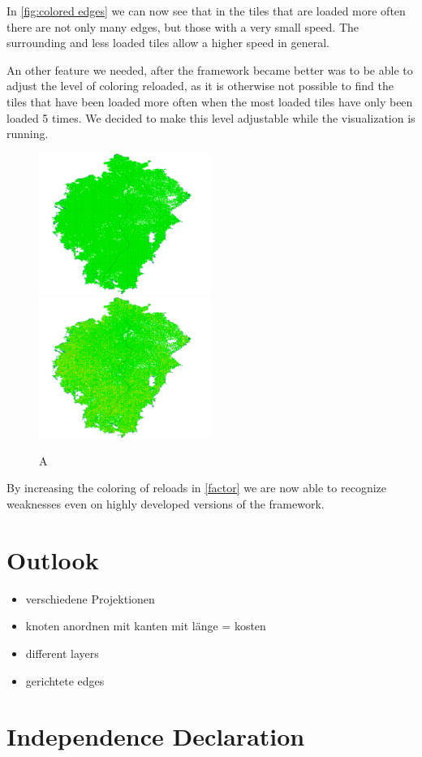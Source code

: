 \documentclass
[
    paper = a4,
    pagesize,
    12 pt,
    oneside,                       %
    open = right,
    DIV = calc,
    BCOR = 0 mm,                   %
    bibtotoc
]
{scrbook}
\begin{document}
In \cref{fig:colored edges} we can now see that in the tiles that are loaded more often there are not only many edges, but those with a very small speed.
The surrounding and less loaded tiles allow a higher speed in general.

An other feature we needed, after the framework became better was to be able to adjust the level of coloring reloaded, as it is otherwise not possible to find the tiles that have been loaded more often when the most loaded tiles have only been loaded 5 times.
We decided to make this level adjustable while the visualization is running.

\begin{figure}[H]
    \includegraphics[width=0.5\textwidth]{Images/vis-no-factor.png}
  \includegraphics[width=0.5\textwidth]{Images/vis-factor.png}
\caption[]{A }
\label{fig:factor}
\end{figure}

By increasing the coloring of reloads in \cref{factor} we are now able to recognize weaknesses even on highly developed versions of the framework.


\chapter{Outlook}
\begin{itemize}
    \item verschiedene Projektionen
    \item knoten anordnen mit kanten mit länge = kosten
    \item different layers
    \item gerichtete edges
\end{itemize}



\chapter*{Independence Declaration}

\end{document}
